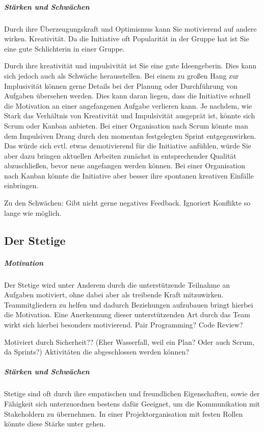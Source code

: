 \documentclass[twocolumn,10pt]{asme2ej}
\begin{document}
\subparagraph{Stärken und Schwächen}
Durch ihre Überzeugungskraft und Optimismus kann Sie motivierend auf andere wirken. 
Kreativität. 
Da die Initiative oft Popularität in der Gruppe hat ist Sie eine gute Schlichterin in einer Gruppe.

Durch ihre kreativität und impulsivität ist Sie eine gute Ideengeberin. Dies kann sich jedoch auch als Schwäche herausstellen. Bei einem zu großen Hang zur Implusivität können gerne Details bei der Planung oder Durchführung von Aufgaben übersehen werden. Dies kann daran liegen, dass die Initiative schnell die Motivation an einer angefangenen Aufgabe verlieren kann. Je nachdem, wie Stark das Verhältnis von Kreativität und Impulsivität ausgeprät ist, könnte sich Scrum oder Kanban anbieten. Bei einer Organisation nach Scrum könnte man dem Impulsiven Drang durch den momentan festgelegten Sprint entgegenwirken. Das würde sich evtl. etwas demotivierend für die Initiative anfühlen, würde Sie aber dazu bringen aktuellen Arbeiten zunächst in entsprechender Qualität abzuschließen, bevor neue angefangen werden können. Bei einer Organisation nach Kanban könnte die Initiative aber besser ihre spontanen kreativen Einfälle einbringen.

Zu den Schwächen: 
Gibt nicht gerne negatives Feedback. Ignoriert Konflikte so lange wie möglich. 


\subsection{Der Stetige}
\subparagraph{Motivation}

Der Stetige wird unter Anderem durch die unterstützende Teilnahme an Aufgaben motiviert, ohne dabei aber als treibende Kraft mitzuwirken. Teammitgliedern zu helfen und dadurch Beziehungen aufzubauen bringt hierbei die Motivation. Eine Anerkennung dieser unterstützenden Art durch das Team wirkt sich hierbei besonders motivierend. Pair Programming? Code Review?	
 

Motiviert durch  Sicherheit?? (Eher Wasserfall, weil ein Plan? Oder auch Scrum, da Sprints?)
Aktivitäten die abgeschlossen werden können? 

\subparagraph{Stärken und Schwächen}

Stetige sind oft durch ihre empatischen und freundlichen Eigenschaften, sowie der Fähigkeit sich unterzuordnen bestens dafür Geeignet, um die Kommunikation mit Stakeholdern zu übernehmen. In einer Projektorganisation mit festen Rollen könnte diese Stärke unter gehen.
\end{document}
